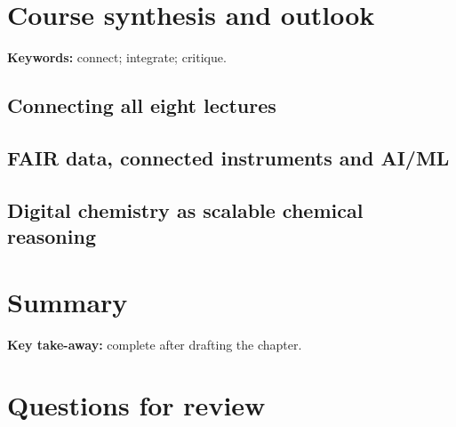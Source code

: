 
\section{Course synthesis and outlook}

\begin{notebox}
\textbf{Keywords:} connect; integrate; critique.
\end{notebox}

\subsection{Connecting all eight lectures}


\subsection{FAIR data, connected instruments and AI/ML}


\subsection{Digital chemistry as scalable chemical reasoning}


\section{Summary}

\begin{notebox}
\textbf{Key take-away:} complete after drafting the chapter.
\end{notebox}

\section{Questions for review}

\solution{4cm}{%
}
